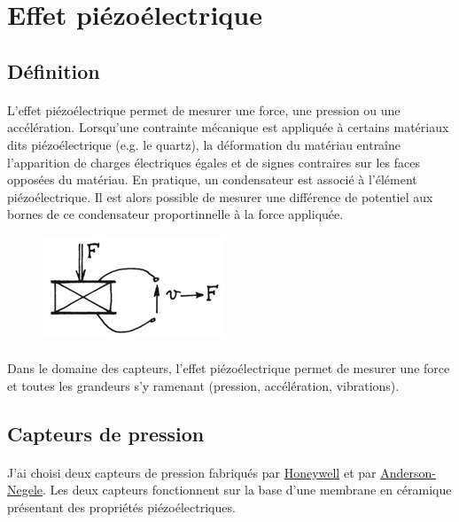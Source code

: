 \documentclass{article}
\begin{document}
    \newpage
    \section{Effet piézoélectrique}

    \subsection{Définition}
    \paragraph{}
    L'effet piézoélectrique permet de mesurer une force, une pression ou une accélération. Lorsqu'une contrainte mécanique est appliquée à certains matériaux dits piézoélectrique (e.g. le quartz), la déformation du matériau entraîne l'apparition de charges électriques égales et de signes contraires sur les faces opposées du matériau. En pratique, un condensateur est associé à l'élément piézoélectrique. Il est alors possible de mesurer une différence de potentiel aux bornes de ce condensateur proportinnelle à la force appliquée.

    \begin{figure}[H]
        \centering
        \includegraphics[width=0.2\linewidth]{./images/effet-piezo.png}
    \end{figure}

    \paragraph{}
    Dans le domaine des capteurs, l'effet piézoélectrique permet de mesurer une force et toutes les grandeurs s'y ramenant (pression, accélération, vibrations).

    \subsection{Capteurs de pression}
    \paragraph{}
    J'ai choisi deux capteurs de pression fabriqués par \href{https://sensing.honeywell.com/}{Honeywell} et par \href{https://www.anderson-negele.com/fr/}{Anderson-Negele}. Les deux capteurs fonctionnent sur la base d'une membrane en céramique présentant des propriétés piézoélectriques.
\end{document}
